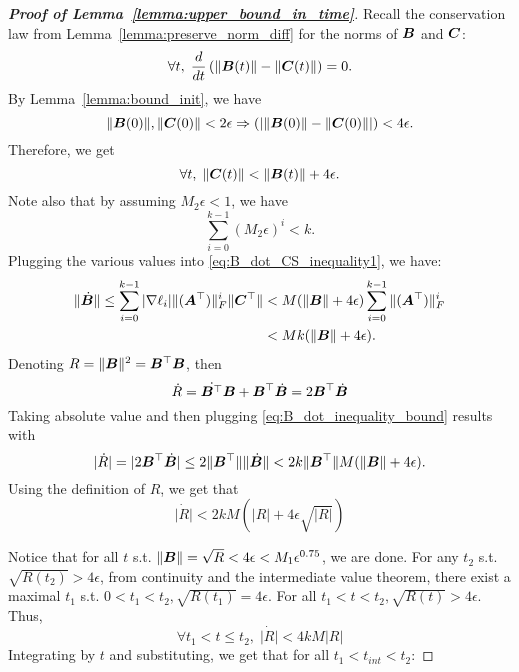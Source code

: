 \begin{proof}[\textbf{Proof of Lemma~\ref{lemma:upper_bound_in_time}}]
Recall the conservation law from Lemma~\ref{lemma:preserve_norm_diff} for the norms of ${\bm{B}}$ and ${\bm{C}}$:
\begin{equation}
    \forall t,\; \frac{d}{dt}\left(\left\|{\bm{B}}(t)\right\|-\left\|{\bm{C}}(t)\right\|\right) = 0.
\end{equation}
%
By Lemma~\ref{lemma:bound_init}, we have
\begin{equation}
    \|{\bm{B}}(0)\|, \|{\bm{C}}(0)\| < 2 \epsilon \Rightarrow (|\|{\bm{B}}(0)\|-\|{\bm{C}}(0)\||) < 4 \epsilon.
\end{equation}
Therefore, we get
\begin{equation}
    \forall t,\; \|{\bm{C}}(t)\| < \|{\bm{B}}(t)\|+4 \epsilon.
\end{equation}
Note also that by assuming $M_2 \epsilon<1$, we have
\begin{equation}
    \sum_{i=0}^{k-1}(M_2\epsilon)^i< k.
\end{equation}
Plugging the various values into \eqref{eq:B_dot_CS_inequality1}, we have:
\begin{align}
\label{eq:B_dot_inequality_bound}
    \|\dot{{\bm{B}}}\| \leq  \sum_{i=0}^{k-1} |\nabla \ell_i| \|({\bm{A}}^\top)\|_F^i \|{\bm{C}}^\top\| &< M (\|{\bm{B}}\|+4 \epsilon) \sum_{i=0}^{k-1} \|({\bm{A}}^\top)\|_F^i \\
    &< Mk (\|{\bm{B}}\|+4 \epsilon).
\end{align}
Denoting $R = \|{\bm{B}}\|^2 = {\bm{B}}^\top {\bm{B}}$, then
\begin{equation}
    \dot{R} = \dot{{\bm{B}}^\top}{\bm{B}} + {\bm{B}}^\top\dot{{\bm{B}}} = 2{\bm{B}}^\top\dot{{\bm{B}}}
\end{equation}
%
Taking absolute value and then plugging \eqref{eq:B_dot_inequality_bound} results with %
\begin{equation}
    |\dot{R}| = |2{\bm{B}}^\top\dot{{\bm{B}}}| \leq 2 \|{\bm{B}}^\top\| \|\dot{{\bm{B}}}\| < 2k \|{\bm{B}}^\top\| M (\|{\bm{B}}\|+4 \epsilon).
\end{equation}
Using the definition of $R$, we get that
\begin{equation}
    \dot{|R|} < 2k M (|R|+4 \epsilon \sqrt{|R|})
\end{equation}

Notice that for all $t$ s.t. $\|{\bm{B}}\| = \sqrt{R}<4 \epsilon<M_1 \epsilon^{0.75}$, we are done.
For any $t_2$ s.t. $\sqrt{R(t_2)}>4 \epsilon$, from continuity and the intermediate value theorem, there exist a maximal $t_1$ s.t. $0 < t_1<t_2, \sqrt{R(t_1)}= 4 \epsilon$. For all $t_1<t<t_2, \sqrt{R(t)}>4 \epsilon$.
Thus,
\begin{equation}
    \forall t_1<t \leq t_2,\; \dot{|R|} < 4k M |R|
\end{equation}
%
Integrating by $t$ and substituting, we get that for all $t_1<t_{int}<t_2$:


\end{proof}
